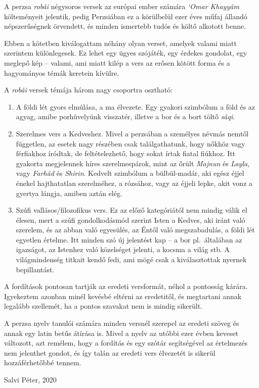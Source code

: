 A perzsa \emph{robâi} négysoros versek az európai ember számára \emph{`Omar
Khayyâm} költeményeit jelentik, pedig Perzsiában ez a körülbelül ezer
éves műfaj állandó népszerűségnek örvendett, és minden ismertebb tudós
és költő alkotott benne.

Ebben a kötetben kiválogattam néhány olyan verset, a\-me\-lyek valami
miatt szerintem különlegesek. Ez lehet egy ügyes szójáték, egy érdekes
gondolat, egy meglepő kép -- valami, ami miatt kilép a vers az erősen
kötött forma és a hagyományos témák keretein kívülre.

A \emph{robâi} versek témája három nagy csoportra osztható:

\begin{enumerate}
\item A földi lét gyors elmúlása, a ma élvezete. Egy gyakori
  szimbólum a föld és az agyag, amibe porhüvelyünk visszatér, illetve
  a bor és a bort töltő \emph{sâqi}.
\item Szerelmes vers a Kedveshez. Mivel a perzsában a személyes névmás
  nemtől független, az esetek nagy részében csak találgathatunk, hogy
  nőkhöz vagy férfiakhoz íródtak, de feltételezhető, hogy sokat írtak
  fiatal fiúkhoz. Itt gyakorta megjelennek híres szerelmespárok, mint
  az őrült \emph{Majnun} és \emph{Layla}, vagy \emph{Farhâd} és
  \emph{Shirin}. Kedvelt szimbólum a bülbül-madár, aki egész éjjel
  énekel hajthatatlan szerelméhez, a rózsához, vagy az éjjeli lepke,
  akit vonz a gyertya lángja, amiben aztán elég.
\item Szúfi vallásos/filozofikus vers. Ez az előző kategóriától nem mindig válik
  el élesen, mert a szúfi gondolkodásmód szerint Isten a Kedves, aki
  iránt való szerelem, és az abban való egyesülés, az Éntől való
  megszabadulás, a földi lét egyetlen értelme. Itt minden szó új
  jelentést kap -- a bor pl.~általában az igazságot, az Istenhez való
  közelséget jelenti, a kocsma a világ stb. A világmindenség titkait
  kendő fedi, ami mögé csak a kiválasztottak nyernek bepillantást.
\end{enumerate}

A fordítások pontosan tartják az eredeti versformát, néhol a pontosság
kárára. Igyekeztem azonban minél kevésbé eltérni az eredetitől, és
megtartani annak legalább szellemét, ha a pontos szavakat nem is
mindig sikerült.

A perzsa nyelv tanulói számára minden versnél szerepel az eredeti
szöveg és annak egy latin betűs átírása is. Mivel a nyelv az utóbbi
ezer évben keveset változott, azt remélem, hogy a fordítás és egy
szótár segítségével az értelmezés nem jelenthet gondot, és így talán
az eredeti vers élvezetét is sikerül hozzáférhetőbbé tennem.

\begin{flushright}
  Salvi Péter, 2020
\end{flushright}
